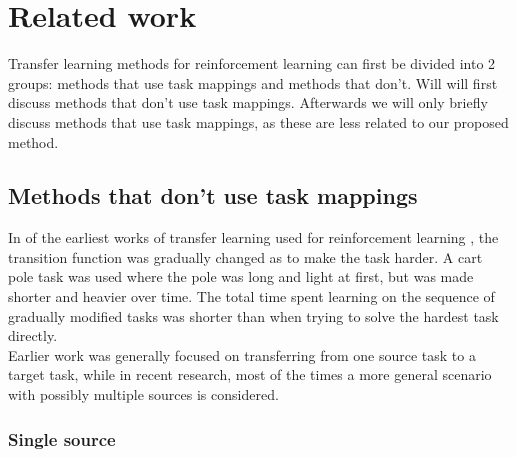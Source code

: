 \documentclass[a4paper]{article}
\begin{document}
\section{Related work}




Transfer learning methods for reinforcement learning can first be divided into 2 groups: methods that use task mappings and methods that don't. Will will first discuss methods that don't use task mappings. Afterwards we will only briefly discuss methods that use task mappings, as these are less related to our proposed method.

\subsection{Methods that don't use task mappings} %
\label{sub:methods_that_don_t_use_task_mappings}
In of the earliest works of transfer learning used for reinforcement learning \citep{conf/ijcai/SelfridgeSB85}, the transition function was gradually changed as to make the task harder. A cart pole task was used where the pole was long and light at first, but was made shorter and heavier over time. The total time spent learning on the sequence of gradually modified tasks was shorter than when trying to solve the hardest task directly.\\

Earlier work was generally focused on transferring from one source task to a target task, while in recent research, most of the times a more general scenario with possibly multiple sources is considered.

\subsubsection{Single source} %
\label{ssub:single_source}


\end{document}
